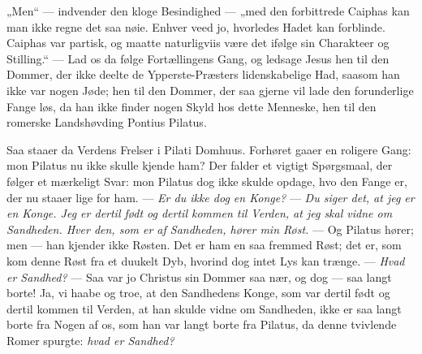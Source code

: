 \documentclass[12pt,a4paper]{book}
\begin{document}
„Men“ --- indvender den kloge Besindighed --- „med den forbittrede Caiphas kan
man ikke regne det saa nøie. Enhver veed jo, hvorledes Hadet kan forblinde.
Caiphas var partisk, og maatte naturligviis være det ifølge sin Charakteer og
Stilling.“ --- Lad os da følge Fortællingens Gang, og ledsage Jesus hen til den
Dommer, der ikke deelte de Ypperste-Præsters lidenskabelige Had, saasom han ikke
var nogen Jøde; hen til den Dommer, der saa gjerne vil lade den forunderlige
Fange løs, da han ikke finder nogen Skyld hos dette Menneske, hen til den
romerske Landshøvding Pontius Pilatus.

Saa staaer da Verdens Frelser i Pilati Domhuus. Forhøret gaaer en roligere Gang:
mon Pilatus nu ikke skulle kjende
ham? Der falder et vigtigt Spørgsmaal, der følger et mærkeligt Svar: mon Pilatus
dog ikke skulde opdage, hvo den Fange er, der nu staaer lige for ham. ---
\emph{Er du ikke dog en Konge?} --- \emph{Du siger det, at jeg er en Konge. Jeg
er dertil født og dertil kommen til Verden, at jeg skal vidne om Sandheden. Hver
den, som er af Sandheden, hører min Røst.} --- Og Pilatus hører; men --- han
kjender ikke Røsten. Det er ham en saa fremmed Røst; det er, som kom denne Røst
fra et duukelt Dyb, hvorind dog intet Lys kan trænge. --- \emph{Hvad er Sandhed?}
--- Saa var jo Christus sin Dommer saa nær, og dog --- saa langt borte! Ja, vi
haabe og troe, at den Sandhedens Konge, som var dertil født og dertil kommen til
Verden, at han skulde vidne om Sandheden, ikke er saa langt borte fra Nogen af
os, som han var langt borte fra Pilatus, da denne tvivlende Romer spurgte:
\emph{hvad er Sandhed?}
\end{document}
